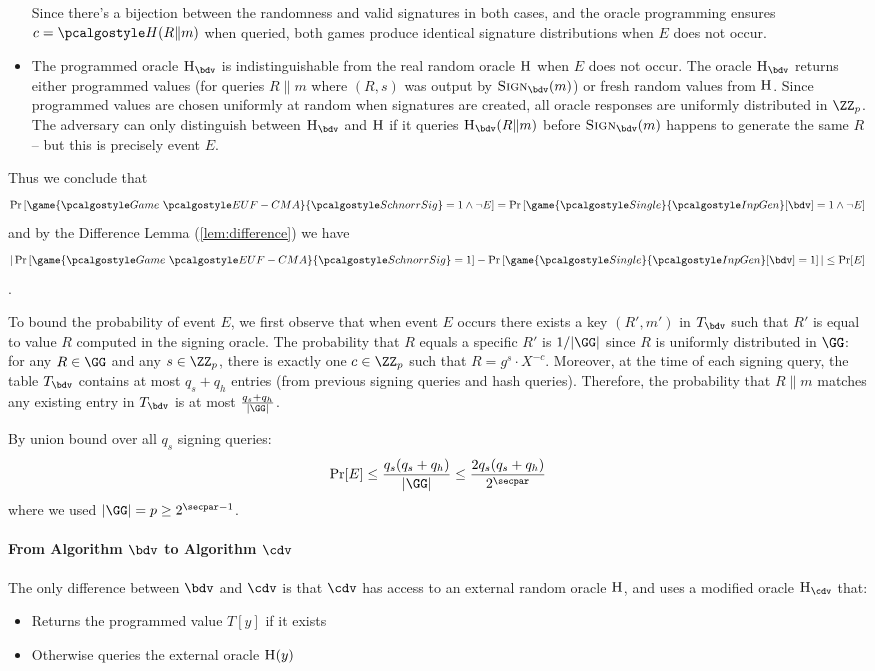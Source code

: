 \begin{mysolution}
\begin{itemize}
    Since there's a bijection between the randomness and valid signatures in both cases, and the oracle programming ensures $c = \algo{H}(R \| m)$ when
  queried, both games produce identical signature distributions when $E$ does not occur.
  \item The programmed oracle $\pcoracle{H}_{\bdv}$ is indistinguishable from the real random oracle ${\normalfont\textsc{H}}$ when $E$ does not occur. The oracle
  $\pcoracle{H}_{\bdv}$ returns either programmed values (for queries $R \| m$ where $(R, s)$ was output by $\pcoracle{Sign}_{\bdv}(m)$) or fresh random
  values from ${\normalfont\textsc{H}}$. Since programmed values are chosen uniformly at random when signatures are created, all oracle responses are uniformly
  distributed in $\ZZ_p$. The adversary can only distinguish between $\pcoracle{H}_{\bdv}$ and ${\normalfont\textsc{H}}$ if it queries $\pcoracle{H}_{\bdv}(R \| m)$
  before $\pcoracle{Sign}_{\bdv}(m)$ happens to generate the same $R$ – but this is precisely event $E$.
  \end{itemize}

  Thus we conclude that
  \[
    \pr{\game{\Game~\algo{EUF-CMA}}{\algo{SchnorrSig}} = 1 \wedge \neg E} =  \pr{\game{\algo{Single}}{\algo{InpGen}}[\bdv] = 1 \wedge \neg E}
  \] and by the Difference Lemma (\autoref{lem:difference}) we have
  \[
    |\pr{\game{\Game~\algo{EUF-CMA}}{\algo{SchnorrSig}} = 1} - \pr{\game{\algo{Single}}{\algo{InpGen}}[\bdv] = 1}| \leq \Pr[E]
  \].

  To bound the probability of event $E$, we first observe that when event $E$ occurs there exists a key $(R', m')$ in $T_{\bdv}$ such that $R'$ is equal to value $R$ computed in the signing oracle.
  The probability that $R$ equals a specific $R'$ is $1/|\GG|$ since $R$ is uniformly distributed in $\GG$: for any $R \in \GG$ and any $s \in \ZZ_p$, there is exactly one $c \in \ZZ_p$ such that $R = g^s \cdot X^{-c}$.
  Moreover, at the time of each signing query, the table $T_{\bdv}$ contains at most $q_s + q_h$ entries (from previous signing queries and hash queries).
  Therefore, the probability that $R \| m$ matches any existing entry in $T_{\bdv}$ is at most $\frac{q_s + q_h}{|\GG|}$.

  By union bound over all $q_s$ signing queries:
  \[
    \Pr[E] \leq \frac{q_s(q_s + q_h)}{|\GG|} \leq \frac{2 q_s(q_s + q_h)}{2^\secpar}
  \]
  where we used $|\GG| = p \geq 2^{\secpar-1}$.

  \paragraph{From Algorithm $\bdv$ to Algorithm $\cdv$}
  The only difference between $\bdv$ and $\cdv$ is that $\cdv$ has access to an external random oracle ${\normalfont\textsc{H}}$, and uses a modified oracle $\pcoracle{H}_{\cdv}$ that:
  \begin{itemize}
    \item Returns the programmed value $T[y]$ if it exists
    \item Otherwise queries the external oracle ${\normalfont\textsc{H}}(y)$
  \end{itemize}


\end{mysolution}
